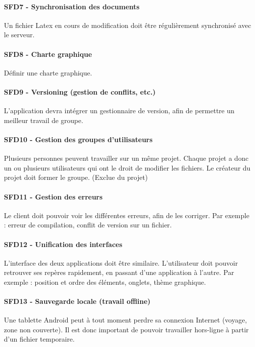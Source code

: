 \documentclass[a4paper,12pt]{article}
\begin{document}
\paragraph{SFD7 - Synchronisation des documents\\}
Un fichier Latex en cours de modification doit être régulièrement synchronisé avec le serveur.

\paragraph{SFD8 - Charte graphique\\}
Définir une charte graphique.


\paragraph{SFD9 - Versioning (gestion de conflits, etc.)\\}
L'application devra intégrer un gestionnaire de version, afin de permettre un meilleur travail de
groupe.

\paragraph{SFD10 - Gestion des groupes d'utilisateurs\\}
Plusieurs personnes peuvent travailler sur un même projet. Chaque projet a donc un ou plusieurs 
utilisateurs qui ont le droit de modifier les fichiers. Le créateur du projet doit former le groupe. (Exclue du projet)

\paragraph{SFD11 - Gestion des erreurs\\}
Le client doit pouvoir voir les différentes erreurs, afin de les corriger. Par exemple : erreur 
de compilation, conflit de version sur un fichier.

\paragraph{SFD12 - Unification des interfaces\\}
L'interface des deux applications doit être similaire. L'utilisateur doit pouvoir retrouver ses
repères rapidement, en passant d'une application à l'autre. Par exemple : position et ordre des 
éléments, onglets, thème graphique.

\paragraph{SFD13 - Sauvegarde locale (travail offline)\\}
Une tablette Android peut à tout moment perdre sa connexion Internet (voyage, zone non couverte). 
Il est donc important de pouvoir travailler hors-ligne à partir d'un fichier temporaire.
\end{document}
